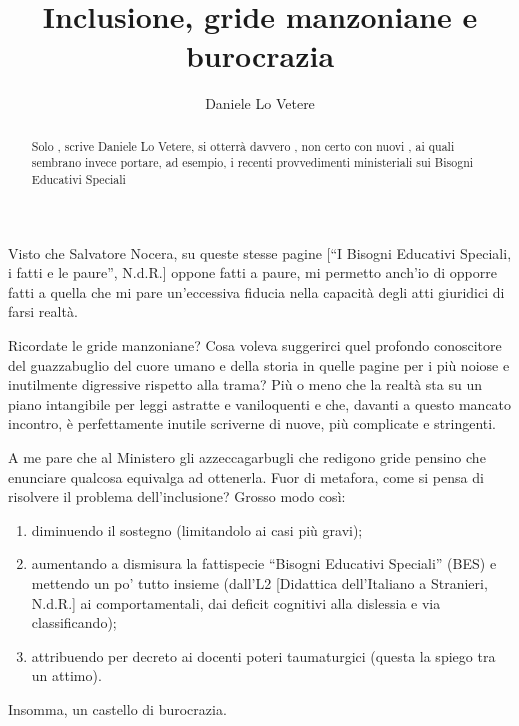 \author{Daniele Lo Vetere}
\title{Inclusione, gride manzoniane e burocrazia}
\label{cha:danilellovetere1}
\begin{abstract}
Solo , scrive Daniele Lo Vetere, si otterrà davvero , non certo con nuovi , ai quali sembrano invece portare, ad esempio, i recenti provvedimenti ministeriali sui Bisogni Educativi Speciali
\end{abstract}
\maketitle
{}
Visto che Salvatore Nocera, su queste stesse pagine\pageref{cha:nocera030613} [“I Bisogni Educativi Speciali, i fatti e le paure”, N.d.R.] oppone fatti a paure, mi permetto anch'io di opporre fatti a quella che mi pare un'eccessiva fiducia nella capacità degli atti giuridici di farsi realtà.

Ricordate le gride manzoniane? Cosa voleva suggerirci quel profondo conoscitore del guazzabuglio del cuore umano e della storia in quelle pagine per i più noiose e inutilmente digressive rispetto alla trama? Più o meno che la realtà sta su un piano intangibile per leggi astratte e vaniloquenti e che, davanti a questo mancato incontro, è perfettamente inutile scriverne di nuove, più complicate e stringenti.

A me pare che al Ministero gli azzeccagarbugli che redigono gride pensino che enunciare qualcosa equivalga ad ottenerla.
Fuor di metafora, come si pensa di risolvere il problema dell'inclusione? Grosso modo così: 
\begin{enumerate}
	\item diminuendo il sostegno (limitandolo ai casi più gravi);
	\item  aumentando a dismisura la fattispecie “Bisogni Educativi Speciali” (BES) e mettendo un po' tutto insieme (dall'L2 [Didattica dell'Italiano a Stranieri, N.d.R.] ai comportamentali, dai deficit cognitivi alla dislessia e via classificando);
	\item  attribuendo per decreto ai docenti poteri taumaturgici (questa la spiego tra un attimo).
\end{enumerate}
 Insomma, un castello di burocrazia.

